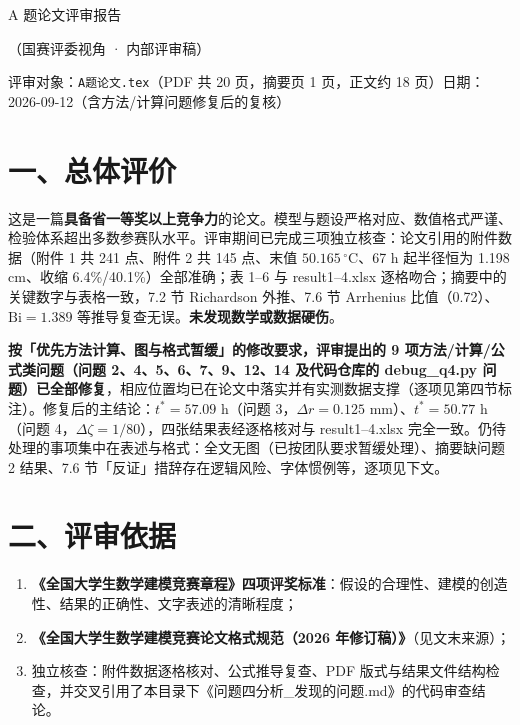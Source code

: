 \documentclass[12pt,a4paper]{ctexart}
\begin{document}
\begin{center}
{\heiti{} A 题论文评审报告\par}
\vspace{0.4em}
{\heiti{} （国赛评委视角 · 内部评审稿）\par}
\vspace{0.3em}
{ 评审对象：\texttt{A题论文.tex}（PDF 共 20 页，摘要页 1 页，正文约 18 页）\quad 日期：2026-09-12（含方法/计算问题修复后的复核）\par}
\end{center}

\vspace{0.6em}

\section{一、总体评价}

这是一篇\textbf{具备省一等奖以上竞争力}的论文。模型与题设严格对应、数值格式严谨、检验体系超出多数参赛队水平。评审期间已完成三项独立核查：论文引用的附件数据（附件 1 共 241 点、附件 2 共 145 点、末值 $50.165\,^\circ$C、67 h 起半径恒为 1.198 cm、收缩 6.4\%/40.1\%）全部准确；表 1--6 与 result1--4.xlsx 逐格吻合；摘要中的关键数字与表格一致，7.2 节 Richardson 外推、7.6 节 Arrhenius 比值（0.72）、$\mathrm{Bi}=1.389$ 等推导复查无误。\textbf{未发现数学或数据硬伤}。

\textbf{按「优先方法计算、图与格式暂缓」的修改要求，评审提出的 9 项方法/计算/公式类问题（问题 2、4、5、6、7、9、12、14 及代码仓库的 debug\_q4.py 问题）已全部修复}，相应位置均已在论文中落实并有实测数据支撑（逐项见第四节标注）。修复后的主结论：$t^*=57.09$ h（问题 3，$\Delta r=0.125$ mm）、$t^*=50.77$ h（问题 4，$\Delta\zeta=1/80$），四张结果表经逐格核对与 result1--4.xlsx 完全一致。仍待处理的事项集中在表述与格式：全文无图（已按团队要求暂缓处理）、摘要缺问题 2 结果、7.6 节「反证」措辞存在逻辑风险、字体惯例等，逐项见下文。

\section{二、评审依据}

\begin{enumerate}[label=(\arabic*),leftmargin=3em]
\item \textbf{《全国大学生数学建模竞赛章程》四项评奖标准}：假设的合理性、建模的创造性、结果的正确性、文字表述的清晰程度；
\item \textbf{《全国大学生数学建模竞赛论文格式规范（2026 年修订稿）》}（见文末来源）；
\item 独立核查：附件数据逐格核对、公式推导复查、PDF 版式与结果文件结构检查，并交叉引用了本目录下《问题四分析\_发现的问题.md》的代码审查结论。
\end{enumerate}
\end{document}
